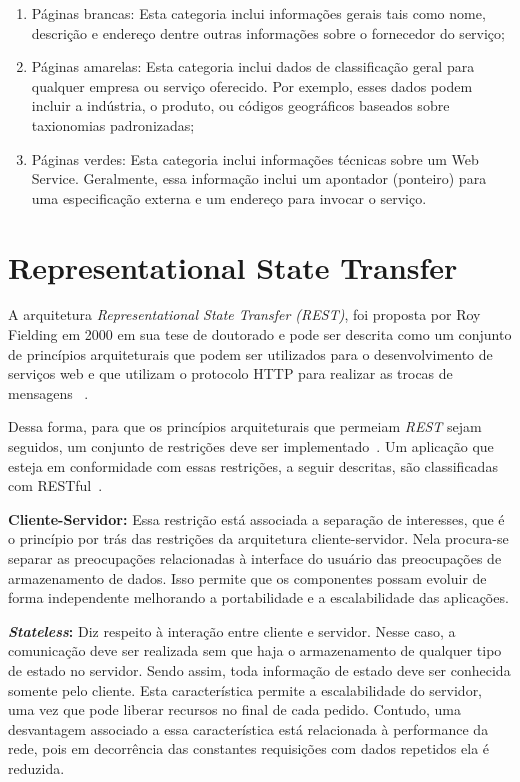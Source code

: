 \begin{enumerate}[a )]
	\item Páginas brancas: Esta categoria inclui informações gerais tais como nome, descrição e endereço dentre outras informações sobre o fornecedor do serviço;

	\item Páginas amarelas: Esta categoria inclui dados de classificação geral para qualquer empresa ou serviço oferecido. Por exemplo, esses dados podem incluir a indústria, o produto, ou códigos geográficos baseados sobre taxionomias padronizadas;

	\item Páginas verdes: Esta categoria inclui informações técnicas sobre um Web Service. Geralmente, essa informação inclui um apontador (ponteiro) para uma especificação externa e um endereço para invocar o serviço.

\end{enumerate}

\section{Representational State Transfer}\label{sec:rest}
A arquitetura \emph{Representational State Transfer (REST)}, foi proposta por Roy Fielding em
2000 em sua tese de doutorado e pode ser descrita como um conjunto de princípios arquiteturais que podem ser utilizados para o desenvolvimento de serviços web e que utilizam o protocolo HTTP para realizar as trocas de mensagens ~\cite{ Fielding2000}.

Dessa forma, para que os princípios arquiteturais que permeiam \emph{REST} sejam seguidos, um conjunto de restrições deve ser implementado~\cite{ Fielding2000}. Um aplicação que esteja em conformidade com essas restrições, a seguir descritas, são classificadas com RESTful~\cite{Richardson2007}.

\textbf{Cliente-Servidor:} Essa restrição está associada a separação de interesses, que é o princípio por trás das restrições da arquitetura cliente-servidor. Nela procura-se separar as preocupações relacionadas à interface do usuário das preocupações de armazenamento de dados. Isso permite que os componentes possam evoluir de forma independente melhorando a portabilidade e a escalabilidade das aplicações.

\textbf{\emph{Stateless}:} Diz respeito à interação entre cliente e servidor. Nesse caso, a  comunicação deve ser realizada sem que haja o armazenamento de qualquer tipo de estado no servidor. Sendo assim,  toda informação de estado deve ser conhecida somente pelo cliente.  Esta característica permite a escalabilidade do servidor, uma vez que pode liberar recursos no final de cada pedido.
Contudo, uma desvantagem associado a essa característica  está relacionada à performance da rede, pois em decorrência das constantes requisições com dados repetidos  ela é reduzida.

